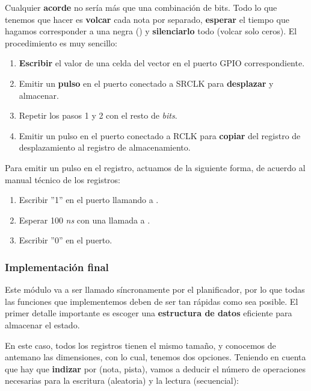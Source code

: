 \smallskip

Cualquier \textbf{acorde} no sería más que una combinación de bits. Todo lo que tenemos que hacer es \textbf{volcar} cada nota por separado, \textbf{esperar} el tiempo que hagamos corresponder a una negra (\quarternote) y \textbf{silenciarlo} todo (volcar solo ceros). El procedimiento es muy sencillo:

\begin{enumerate}
	\item \textbf{Escribir} el valor de una celda del vector en el puerto \acrshort{GPIO} correspondiente.
	\item Emitir un \textbf{pulso} en el puerto conectado a SRCLK para \textbf{desplazar} y almacenar.
	\item Repetir los pasos 1 y 2 con el resto de \textit{bits}.
	\item Emitir un pulso en el puerto conectado a RCLK para \textbf{copiar} del registro de desplazamiento al registro de almacenamiento.
\end{enumerate}

Para emitir un pulso en el registro, actuamos de la siguiente forma, de acuerdo al manual técnico de los registros:

\begin{enumerate}
	\item Escribir ''1'' en el puerto llamando a .
	\item Esperar 100 \textit{ns} con una llamada a .
	\item Escribir ''0'' en el puerto.
\end{enumerate}

\subsubsection{Implementación final}

Este módulo va a ser llamado síncronamente por el planificador, por lo que todas las funciones que implementemos deben de ser tan rápidas como sea posible. El primer detalle importante es escoger una \textbf{estructura de datos} eficiente para almacenar el estado.

En este caso, todos los registros tienen el mismo tamaño, y conocemos de antemano las dimensiones, con lo cual, tenemos dos opciones. Teniendo en cuenta que hay que \textbf{indizar} por (nota, pista), vamos a deducir el número de operaciones necesarias para la escritura (aleatoria) y la lectura (secuencial):

